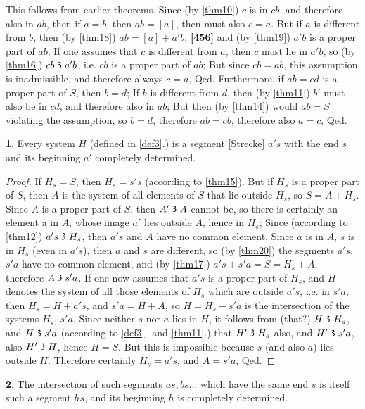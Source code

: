 \documentclass[leqno,hidelinks,a4paper]{article}
\theoremstyle{definition}
\newtheorem{satz}{\protect\satzname}
\newcommand{\satzname}{}
\renewcommand{\satzname}{\hspace{-4pt}.\ Satz}%
\renewcommand{\satzname}{\hspace{-4pt}.\ Theorem}%
\newcommand\partof{\mathrel{\raisebox{0.45ex}{$\mathfrak{3}$}}}
\begin{document}
This follows from earlier theorems.
Since (by \ref{thm10}) $c$ is in $cb$, and therefore also in $ab$, then if $a=b$, then $ab = [a]$, then must also $c=a$.
But if $a$ is different from $b$, then (by \ref{thm18}) $ab = [a]+a'b$, \textbf{[456]} and (by \ref{thm19}) $a'b$ is a proper part of $ab$;
If one assumes that $c$ is different from $a$, then $c$ must lie in $a'b$, so (by \ref{thm16}) $cb \partof a'b$, i.e. $cb$ is a proper part of $ab$;
But since $cb=ab$, this assumption is inadmissible, and therefore always $c=a$, Qed.
Furthermore, if $ab=cd$ is a proper part of $S$, then $b=d$; If $b$ is different from $d$, then (by \ref{thm11}) $b'$ must also be in $cd$, and therefore also in $ab$; But then (by \ref{thm14}) would $ab = S$ violating the assumption, so $b=d$, therefore $ab=cb$, therefore also $a=c$, Qed.

\begin{satz}\label{thm27}
Every system $H$ (defined in \ref{def3}.) is a segment [Strecke] $a's$ with the end $s$ and its beginning $a'$ completely determined.
\end{satz}
\begin{proof}
If $H_s= S$, then $H_s= s's$ (according to \ref{thm15}).
But if $H_s$ is a proper part of $S$, then $A$ is the system of all elements of $S$ that lie outside $H_s$, so $S=A+H_s$.
Since $A$ is a proper part of $S$, then $A' \partof A$ cannot be, so there is certainly an element a in $A$, whose image $a'$ lies outside $A$, hence in $H_s$;
Since (according to \ref{thm12}) $a's \partof H_s$, then $a's$ and $A$ have no common element.
Since $a$ is in $A$, $s$ is in $H_s$ (even in $a's$), then $a$ and $s$ are different, so (by \ref{thm20}) the segments $a's$, $s'a$ have no common element, and (by \ref{thm17}) $a's+  s'a=S=H_s+ A,$ therefore $A \partof s'a$.
If one now assumes that $a's$ is a proper part of $H_s$, and $H$ denotes the system of all those elements of $H_s$ which are outside $a's$, i.e. in $s'a$, then $H_s = H+a's$, and $s'a = H + A$, so $H=H_s-s'a$ is the intersection of the systems $H_s$, $s'a$.
Since neither $s$ nor $a$ lies in $H$, it follows from (that?) $H \partof H_s$, and $H \partof s'a$ (according to \ref{def3}.\ and \ref{thm11}.) that $H' \partof H_s$ also, and $H' \partof s'a$, also $H' \partof H$, hence $H=S$.
But this is impossible because $s$ (and also $a$) lies outside $H$. Therefore certainly $H_s= a's$, and $A=s'a$, Qed.
\end{proof}

\begin{satz}\label{thm28}
The intersection of such segments $as, bs\ldots$ which have the same end $s$ is itself such a segment $hs$, and its beginning $h$ is completely determined.
\end{satz}
\end{document}
